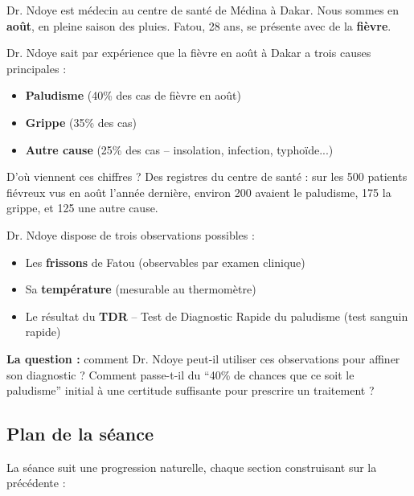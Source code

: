 \documentclass[11pt,a4paper]{article}
\begin{document}
\begin{exemplebox}
Dr. Ndoye est médecin au centre de santé de Médina à Dakar. Nous sommes en \textbf{août}, en pleine saison des pluies. Fatou, 28 ans, se présente avec de la \textbf{fièvre}.

Dr. Ndoye sait par expérience que la fièvre en août à Dakar a trois causes principales :
\begin{itemize}[nosep]
    \item \textbf{Paludisme} (40\% des cas de fièvre en août)
    \item \textbf{Grippe} (35\% des cas)
    \item \textbf{Autre cause} (25\% des cas -- insolation, infection, typhoïde...)
\end{itemize}

D'où viennent ces chiffres ? Des registres du centre de santé : sur les 500 patients fiévreux vus en août l'année dernière, environ 200 avaient le paludisme, 175 la grippe, et 125 une autre cause.

Dr. Ndoye dispose de trois observations possibles :
\begin{itemize}[nosep]
    \item Les \textbf{frissons} de Fatou (observables par examen clinique)
    \item Sa \textbf{température} (mesurable au thermomètre)
    \item Le résultat du \textbf{TDR} -- Test de Diagnostic Rapide du paludisme (test sanguin rapide)
\end{itemize}

\textbf{La question :} comment Dr. Ndoye peut-il utiliser ces observations pour affiner son diagnostic ? Comment passe-t-il du ``40\% de chances que ce soit le paludisme'' initial à une certitude suffisante pour prescrire un traitement ?
\end{exemplebox}

\subsection{Plan de la séance}

La séance suit une progression naturelle, chaque section construisant sur la précédente :
\end{document}
